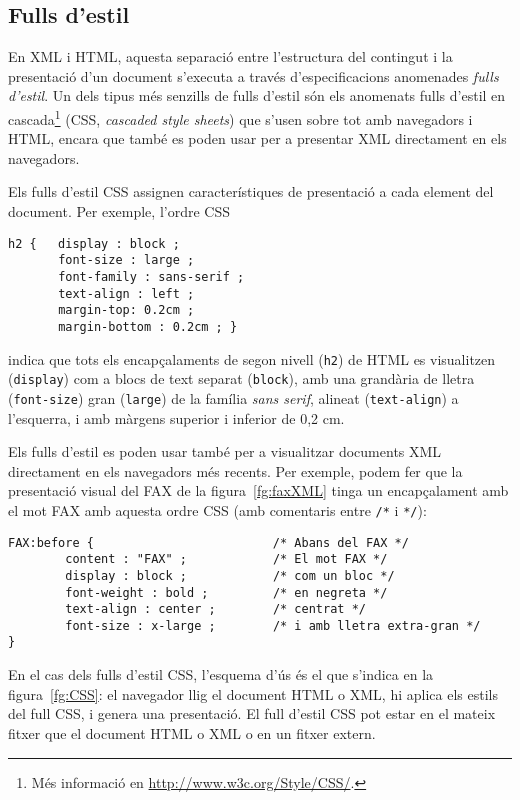 \subsection{Fulls d'estil}

En XML i HTML, aquesta separació entre l'estructura del contingut i la
presentació d'un document s'executa a través d'especificacions
anomenades \emph{fulls d'estil}. Un dels tipus més senzills de fulls
d'estil són els anomenats fulls d'estil en cascada\footnote{Més
  informació en \url{http://www.w3c.org/Style/CSS/}.} (CSS,
\emph{cascaded style sheets}) que s'usen sobre tot amb navegadors i
HTML, encara que també es poden usar per a presentar XML directament
en els navegadors.

Els fulls d'estil CSS assignen característiques de presentació a cada
element del document. Per exemple, l'ordre CSS
\begin{verbatim}
h2 {   display : block ;
       font-size : large ;
       font-family : sans-serif ;
       text-align : left ;
       margin-top: 0.2cm ;
       margin-bottom : 0.2cm ; }
\end{verbatim}
indica que tots els encapçalaments de segon nivell (\texttt{h2}) de
HTML es visualitzen (\texttt{display}) com a blocs de text separat
(\texttt{block}), amb una grandària de lletra (\texttt{font-size}) gran
(\texttt{large}) de la família \emph{sans serif}, alineat
(\texttt{text-align}) a l'esquerra, i amb màrgens superior i inferior
de 0,2 cm.


Els fulls d'estil es poden usar també per a visualitzar documents XML
directament en els navegadors més recents. Per exemple, podem fer que
la presentació visual del FAX de la figura~\ref{fg:faxXML} tinga un
encapçalament amb el mot FAX amb aquesta ordre CSS (amb comentaris
entre \texttt{/*} i \texttt{*/}):
\begin{verbatim}
FAX:before {                         /* Abans del FAX */
        content : "FAX" ;            /* El mot FAX */
        display : block ;            /* com un bloc */
        font-weight : bold ;         /* en negreta */
        text-align : center ;        /* centrat */
        font-size : x-large ;        /* i amb lletra extra-gran */
}
\end{verbatim}

En el cas dels fulls d'estil CSS, l'esquema d'ús és el que s'indica en
la figura~\ref{fg:CSS}: el navegador llig el document HTML o XML, hi
aplica els estils del full CSS, i genera una presentació. El full
d'estil CSS pot estar en el mateix fitxer que el document HTML o XML o
en un fitxer extern.

